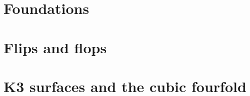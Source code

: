 \section{Foundations}


\section{Flips and flops}


\section{K3 surfaces and the cubic fourfold}



